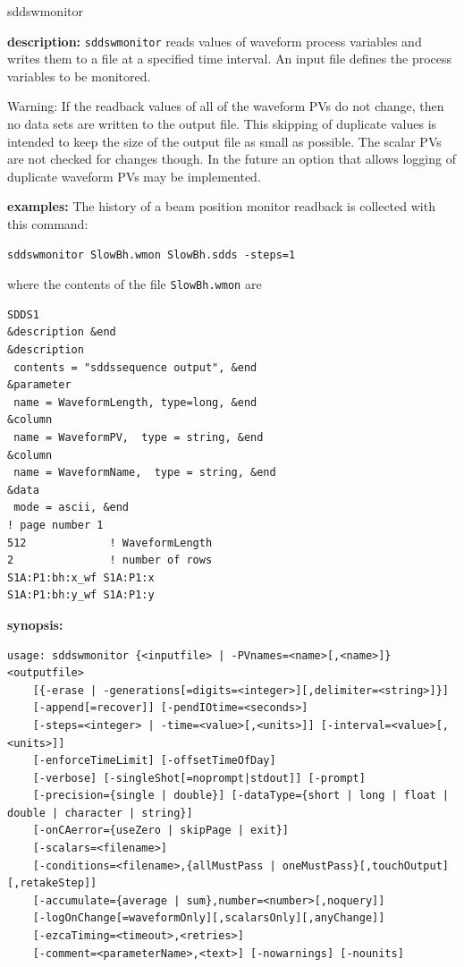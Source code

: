 \begin{sddsprog}{sddswmonitor}
\item \textbf{description:}
\verb+sddswmonitor+ reads values of waveform process variables
and writes them to a file at a specified time interval.
An input file defines the process variables to be monitored.

Warning: If the readback values of all of the waveform PVs do not
change, then no data sets are written to the output file. This
skipping of duplicate values is intended to keep the size of the
output file as small as possible.  The scalar PVs are not checked for
changes though. In the future an option that allows logging of duplicate
waveform PVs may be implemented.

\item \textbf{examples:}
The history of a beam position monitor readback is collected with this command:
\begin{verbatim}
sddswmonitor SlowBh.wmon SlowBh.sdds -steps=1
\end{verbatim}
where the contents of the file \verb+SlowBh.wmon+ are
\begin{verbatim}
SDDS1
&description &end
&description
 contents = "sddssequence output", &end
&parameter
 name = WaveformLength, type=long, &end
&column
 name = WaveformPV,  type = string, &end
&column
 name = WaveformName,  type = string, &end
&data
 mode = ascii, &end
! page number 1
512             ! WaveformLength
2               ! number of rows
S1A:P1:bh:x_wf S1A:P1:x
S1A:P1:bh:y_wf S1A:P1:y
\end{verbatim}
\item \textbf{synopsis:}
\begin{verbatim}
usage: sddswmonitor {<inputfile> | -PVnames=<name>[,<name>]} <outputfile>
    [{-erase | -generations[=digits=<integer>][,delimiter=<string>]}]
    [-append[=recover]] [-pendIOtime=<seconds>]
    [-steps=<integer> | -time=<value>[,<units>]] [-interval=<value>[,<units>]]
    [-enforceTimeLimit] [-offsetTimeOfDay]
    [-verbose] [-singleShot[=noprompt|stdout]] [-prompt]
    [-precision={single | double}] [-dataType={short | long | float | double | character | string}]
    [-onCAerror={useZero | skipPage | exit}]
    [-scalars=<filename>]
    [-conditions=<filename>,{allMustPass | oneMustPass}[,touchOutput][,retakeStep]]
    [-accumulate={average | sum},number=<number>[,noquery]]
    [-logOnChange[=waveformOnly][,scalarsOnly][,anyChange]]
    [-ezcaTiming=<timeout>,<retries>]
    [-comment=<parameterName>,<text>] [-nowarnings] [-nounits]

\end{verbatim}
\end{sddsprog}
